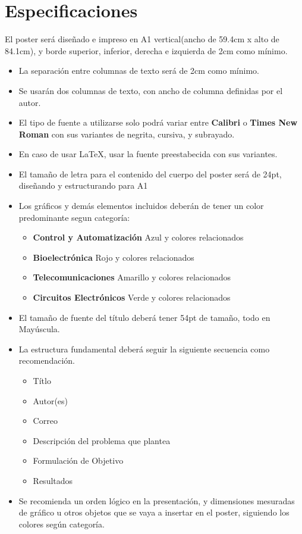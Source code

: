 \documentclass{article}
\begin{document}
 \section{Especificaciones}
 
 El poster será diseñado e impreso en A1 vertical(ancho de 59.4cm x alto de 84.1cm), y borde superior, inferior, derecha e izquierda de 2cm como mínimo. 
 
 \begin{itemize}
 \item La separación entre columnas de texto será de 2cm como mínimo.
 \item Se usarán dos columnas de texto, con ancho de columna definidas por el autor. 
 \item El tipo de fuente a utilizarse solo podrá variar entre \textbf{Calibri} o \textbf{Times New Roman} con sus variantes de negrita, cursiva, y subrayado. 
 \item En caso de usar \LaTeX, usar la fuente preestabecida con sus variantes. 
 \item El tamaño de letra para el contenido del cuerpo del poster será de 24pt, diseñando y estructurando para A1
 \item Los gráficos y demás elementos incluidos deberán de tener un color predominante segun categoría:
 \begin{itemize}
 \item \textbf{Control y Automatización} Azul y colores relacionados
 \item \textbf{Bioelectrónica} Rojo y colores relacionados
 \item \textbf{Telecomunicaciones} Amarillo y colores relacionados
 \item \textbf{Circuitos Electrónicos} Verde y colores relacionados
 \end{itemize}
 
 \item El tamaño de fuente del título deberá tener 54pt de tamaño, todo en Mayúscula.
 \item La estructura fundamental deberá seguir la siguiente secuencia como recomendación.
 \begin{itemize}
 \item Títlo
 \item Autor(es)
 \item Correo
 \item Descripción del problema que plantea
 \item Formulación de Objetivo
 \item Resultados
 \end{itemize}
 \item Se recomienda un orden lógico en la presentación, y dimensiones mesuradas de gráfico u otros objetos que se vaya a insertar en el poster, siguiendo los colores según categoría.
\end{itemize}  
 
\end{document}
